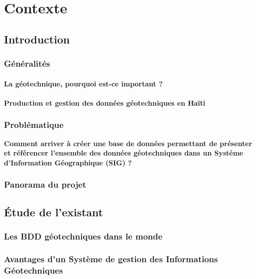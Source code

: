 \chapter{Contexte}
    \section{Introduction}
        
        \subsection{Généralités}
            \subsubsection{La géotechnique, pourquoi est-ce important ?}
            
            \subsubsection{Production et gestion des données géotechniques en Haïti}
                
        \subsection{Problématique}
        \textbf{Comment arriver à créer une base de données permettant de 
        présenter et référencer l'ensemble des données géotechniques dans un Systéme
        d’Information Géographique (SIG) ?}
       
        \subsection{Panorama du projet}
            

    \section{Étude de l'existant}
        \subsection{Les BDD géotechniques dans le monde}
            
        \subsection{Avantages d'un Système de gestion des Informations Géotechniques}
            

